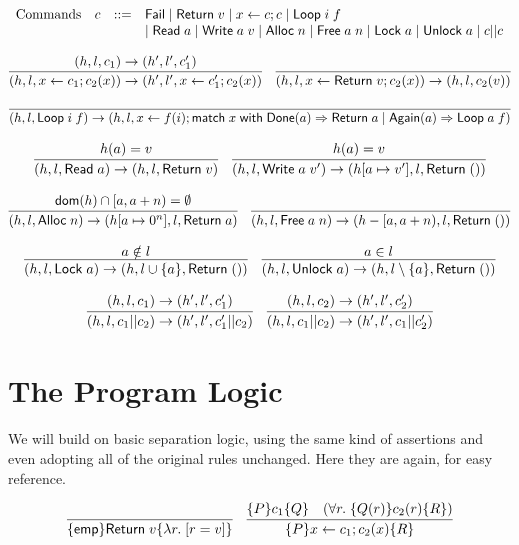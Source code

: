 \documentclass{amsbook}
\theoremstyle{definition}
\theoremstyle{remark}
\numberwithin{section}{chapter}
\numberwithin{equation}{chapter}
\begin{document}
$$\begin{array}{rrcl}
  \textrm{Commands} & c &::=& \mathsf{Fail} \mid \mathsf{Return} \; v \mid x \leftarrow c; c \mid \mathsf{Loop} \; i \; f \\
  &&& \mid \mathsf{Read} \; a \mid \mathsf{Write} \; a \; v \mid \mathsf{Alloc} \; n \mid \mathsf{Free} \; a \; n \mid \mathsf{Lock} \; a \mid \mathsf{Unlock} \; a \mid c || c
\end{array}$$

$$\infer{\smallstep{(h, l, x \leftarrow c_1; c_2(x))}{(h', l', x \leftarrow c'_1; c_2(x))}}{
  \smallstep{(h, l, c_1)}{(h', l', c'_1)}
}
\quad \infer{\smallstep{(h, l, x \leftarrow \mt{Return} \; v; c_2(x))}{(h, l, c_2(v))}}{}$$

$$\infer{\smallstep{(h, l, \mt{Loop} \; i \; f)}{(h, l, x \leftarrow f(i); \mt{match} \; x \; \mt{with} \; \mt{Done}(a) \Rightarrow \mt{Return} \; a \mid \mt{Again}(a) \Rightarrow \mt{Loop} \; a \; f)}}{}$$

$$\infer{\smallstep{(h, l, \mt{Read} \; a)}{(h, l, \mt{Return} \; v)}}{
  \msel{h}{a} = v
}
\quad \infer{\smallstep{(h, l, \mt{Write} \; a \; v')}{(\mupd{h}{a}{v'}, l, \mt{Return} \; ())}}{
  \msel{h}{a} = v
}$$

$$\infer{\smallstep{(h, l, \mt{Alloc} \; n)}{(\mupd{h}{a}{0^n}, l, \mt{Return} \; a)}}{
  \dom{h} \cap [a, a+n) = \emptyset
}
\quad \infer{\smallstep{(h, l, \mt{Free} \; a \; n)}{(h - [a, a+n), l, \mt{Return} \; ())}}{
}$$

$$\infer{\smallstep{(h, l, \mt{Lock} \; a)}{(h, l \cup \{a\}, \mt{Return} \; ())}}{
  a \notin l
}
\quad \infer{\smallstep{(h, l, \mt{Unlock} \; a)}{(h, l \setminus \{a\}, \mt{Return} \; ())}}{
  a \in l
}$$

$$\infer{\smallstep{(h, l, c_1 || c_2)}{(h', l', c'_1 || c_2)}}{
  \smallstep{(h, l, c_1)}{(h', l', c'_1)}
}
\quad \infer{\smallstep{(h, l, c_1 || c_2)}{(h', l', c_1 || c'_2)}}{
  \smallstep{(h, l, c_2)}{(h', l', c'_2)}
}$$


\section{The Program Logic}

We will build on basic separation logic, using the same kind of assertions and even adopting all of the original rules unchanged.
Here they are again, for easy reference.

$$\infer{\hoare{\emp}{\mt{Return} \; v}{\lambda r. \; \lift{r = v}}}{}
\quad \infer{\hoare{P}{x \leftarrow c_1; c_2(x)}{R}}{
  \hoare{P}{c_1}{Q}
  & (\forall r. \; \hoare{Q(r)}{c_2(r)}{R})
}$$
\end{document}
